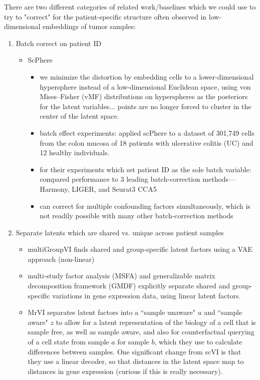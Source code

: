 \documentclass{article}
\begin{document}
There are two different categories of related work/baselines which we could use to try to "correct" for the patient-specific structure often observed in low-dimensional embeddings of tumor samples:
\begin{enumerate}

    \item Batch correct on patient ID
    \begin{itemize}
        \item ScPhere \citep{ding2021deep}
        \begin{itemize}
        \item  we minimize the distortion by embedding cells to a lower-dimensional hypersphere instead of a low-dimensional Euclidean space, using von Mises–Fisher (vMF) distributions on hyperspheres as the posteriors for the latent variables... points are no longer forced to cluster in the center of the latent space. 
        \item batch effect experiments: applied scPhere to a dataset of 301,749 cells from the colon mucosa of 18 patients with ulcerative colitis (UC) and 12 healthy individuals. 
        \item for their experiments which set patient ID as the sole batch variable: compared performance to 3 leading batch-correction methods—Harmony, LIGER, and Seurat3 CCA5
        \item can correct for multiple confounding factors simultaneously, which is not readily possible with many other batch-correction methods
        \end{itemize} 
    \end{itemize}

    
    \item Separate latents which are shared vs. unique  across patient samples
    \begin{itemize}
        \item multiGroupVI \citep{weinberger2022disentangling} finds shared and group-specific latent factors using a VAE approach (non-linear)
        \item multi-study factor analysis (MSFA) \citep{de2019multi} and generalizable matrix decomposition framework (GMDF) \citep{jerby2021pan} explicitly separate shared and group-specific variations in gene expression data, using linear latent factors.
        \item MrVI \citep{boyeau2022deep} separates latent factors into a ``sample unaware" $u$ and ``sample aware" $z$ to allow for a latent representation of the biology of a cell that is sample free, as well as sample aware, and also for counterfactual querying of a cell state from sample $a$ for sample $b$, which they use to calculate differences between samples. One significant change from scVI \citep{lopez2018deep} is that they use a linear decoder, so that distances in the latent space map to distances in gene expression (curious if this is really necessary). 
    \end{itemize}

    

    

\end{enumerate}
\end{document}
